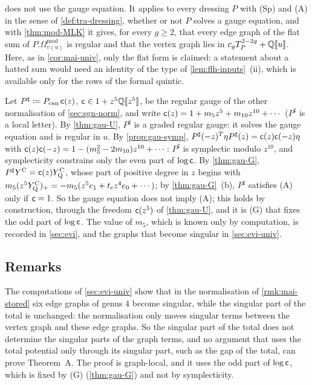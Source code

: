 \begin{rmk}
\label{rmk:mai-annih}
 does not use the gauge equation. It applies to every dressing $P$ with (Sp) and (A) in the sense of \cref{def:tra-dressing}, whether or not $P$ solves a gauge equation, and with \cref{thm:mod-MLK} it gives, for every $g\geq2$, that every edge graph of the flat sum of $P.\Omega^{\mathrm{mod}}_{v(u)}$ is regular and that the vertex graph lies in $c_gT_P^{2-2g}+\mathbb{Q}[\![ u ]\!]$. Here, as in \cref{cor:mai-univ}, only the flat form is claimed: a statement about a hatted sum would need an identity of the type of \cref{lem:flh-inputs}~(ii), which is available only for the rows of the formal quintic.
\end{rmk}

\begin{rmk}
\label{rmk:mai-stored}
Let $P^\sharp\coloneqq P_{\mathrm{can}}\,\mathsf{c}(z)$, $\mathsf{c}\in1+z^5\mathbb{Q}[\![ z^5 ]\!]$, be the regular gauge of the other normalisation of \cref{sec:sgn-norm}, and write $\mathsf{c}(z)=1+m_5z^5+m_{10}z^{10}+\cdots$ ($P^\sharp$ is a local letter). By \cref{thm:gau-U}, $P^\sharp$ is a graded regular gauge: it solves the gauge equation and is regular in $u$. By \cref{prop:gau-symp}, $P^\sharp(-z)^T\eta P^\sharp(z)=\mathsf{c}(z)\mathsf{c}(-z)\eta$ with $\mathsf{c}(z)\mathsf{c}(-z)=1-(m_5^2-2m_{10})z^{10}+\cdots$: $P^\sharp$ is symplectic modulo $z^{10}$, and symplecticity constrains only the even part of $\log\mathsf{c}$. By \cref{thm:gau-G}, $P^\sharp Y^{\mathrm{C}}=\mathsf{c}(z)Y^{\mathrm{C}}_{\mathrm{Q}}$, whose part of positive degree in $z$ begins with $m_5(z^5Y^{\mathrm{C}}_{\mathrm{Q}})_{+}=-m_5(z^5e_1+t_{\mathrm{c}} z^4e_0+\cdots)$; by \cref{thm:gau-G}~(b), $P^\sharp$ satisfies (A) only if $\mathsf{c}=1$. So the gauge equation does not imply (A); this holds by construction, through the freedom $\mathsf{c}(z^5)$ of \cref{thm:gau-U}, and it is (G) that fixes the odd part of $\log\mathsf{c}$. The value of $m_5$, which is known only by computation, is recorded in \cref{sec:evi}, and the graphs that become singular in \cref{sec:evi-univ}.
\end{rmk}

\subsection{Remarks}
\label{sec:mai-rmk}

\begin{rmk}
\label{rmk:mai-graphlocal}
The computations of \cref{sec:evi-univ} show that in the normalisation of \cref{rmk:mai-stored} six edge graphs of genus $4$ become singular, while the singular part of the total is unchanged: the normalisation only moves singular terms between the vertex graph and these edge graphs. So the singular part of the total does not determine the singular parts of the graph terms, and no argument that uses the total potential only through its singular part, such as the gap of the total, can prove Theorem~A. The proof is graph-local, and it uses the odd part of $\log\mathsf{c}$, which is fixed by (G) (\cref{thm:gau-G}) and not by symplecticity.
\end{rmk}

